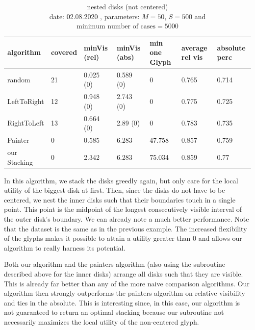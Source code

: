 \documentclass[a4paper,11pt]{article}
\begin{document}
\begin{table}[!h]
  \begin{center}
    \begin{tabular}{| l || p{1.3cm} | p{1.7cm} | p{1.7cm} | p{1.5cm} | p{1.5cm} | p{1.5cm} |}
      \hline
      algorithm    & covered & minVis (rel) & minVis (abs) & min one Glyph & average rel vis & absolute perc \\
      \hline
      random       & 21      & 0.025 (0)    & 0.589 (0)    & 0             & 0.765           & 0.714         \\

      LeftToRight  & 12      & 0.948 (0)    & 2.743 (0)    & 0             & 0.775           & 0.725         \\

      RightToLeft  & 13      & 0.664 (0)    & 2.89 (0)     & 0             & 0.783           & 0.735         \\

      Painter      & 0       & 0.585        & 6.283        & 47.758        & 0.857           & 0.759         \\

      our Stacking & 0       & 2.342        & 6.283        & 75.034        & 0.859           & 0.77          \\

      \hline
    \end{tabular}
  \end{center}
  \caption{nested disks (not centered)\\
    date: 02.08.2020  , parameters: $M=50$, $S=500$ and $\text{minimum number of cases}=5000$  }
\end{table}

In this algorithm, we stack the disks greedly again, but only care for the local utility of the biggest disk at first. Then, since the disks do not have to be centered, we nest the inner disks such that their boundaries touch in a single point. This point is the midpoint of the longest consecutively visible interval of the outer disk's boundary. We can already note a much better performance. Note that the dataset is the same as in the previous example. The increased flexibility of the glyphs makes it possible to attain a utility greater than $0$ and allows our algorithm to really harness its potential.

Both our algorithm and the painters algorithm (also using the subroutine described above for the inner disks) arrange all disks such that they are visible. This is already far better than any of the more naive comparison algorithms. Our algorithm then strongly outperforms the painters algorithm on relative visibility and ties in the absolute. This is interesting since, in this case, our algorithm is not guaranteed to return an optimal stacking because our subroutine not necessarily maximizes the local utility of the non-centered glyph.
\end{document}
